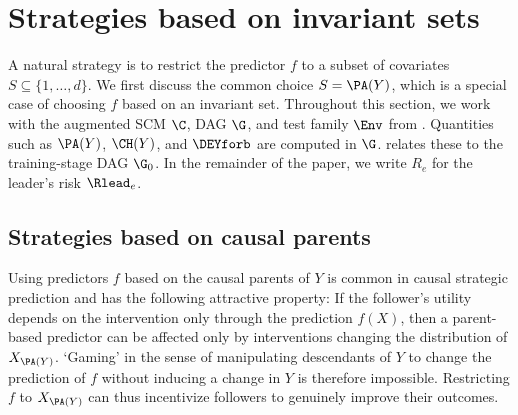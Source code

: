 \section{Strategies 
based on invariant sets
} 
\label{sec:strategiesinvsets}


A natural strategy is to restrict the predictor $f$ to a subset
of covariates $S \subseteq \{1, \ldots, d\}$.
We first discuss the common choice $S= \PA(Y)$, which is a special case of choosing $f$ based on an invariant set. 
Throughout this section, we work with the augmented SCM $\C$, DAG $\G$, and test family $\Env$ from . Quantities such as $\PA(Y)$, $\CH(Y)$, and $\DEYforb$ are computed in $\G$.  relates these to the training-stage DAG $\G_0$. In the remainder of the paper, we write $R_e$ for the leader's risk $\Rlead_e$.
 


\subsection{Strategies based on causal parents} \label{sec:parents}
Using predictors $f$ based on the causal parents of $Y$ 
is common in causal strategic prediction \citep{yanDiscoveringOptimalScoring2023}
and has the following attractive property:
If the follower's utility depends on the intervention only through the
prediction $f(X)$, then a parent-based predictor can be affected only
by interventions changing the distribution of $X_{\PA(Y)}$.
`Gaming'
in the sense of manipulating descendants of $Y$ to change the prediction of $f$ without inducing a change in $Y$ is therefore impossible. 
Restricting $f$ to $X_{\PA(Y)}$ 
can thus incentivize followers to genuinely improve their outcomes.

